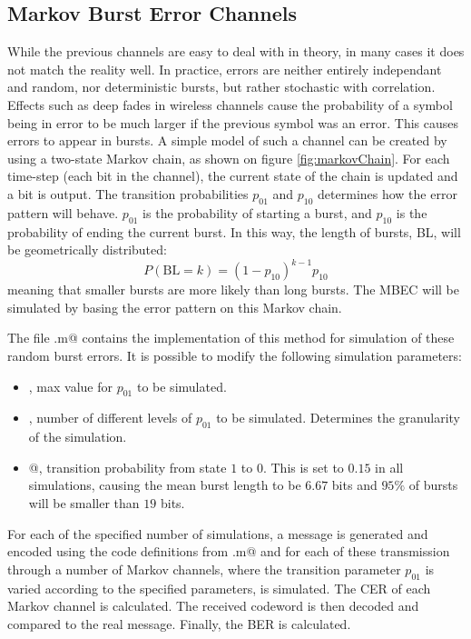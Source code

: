 \subsection{Markov Burst Error Channels}
While the previous channels are easy to deal with in theory, in many cases it does not match the reality well. In practice, errors are neither entirely independant and random, nor deterministic bursts, but rather stochastic with correlation. Effects such as deep fades in wireless channels cause the probability of a symbol being in error to be much larger if the previous symbol was an error. This causes errors to appear in bursts. A simple model of such a channel can be created by using a two-state Markov chain, as shown on figure \ref{fig:markovChain}. For each time-step (each bit in the channel), the current state of the chain is updated and a bit is output. The transition probabilities $p_{01}$ and $p_{10}$ determines how the error pattern will behave. $p_{01}$ is the probability of starting a burst, and $p_{10}$ is the probability of ending the current burst. In this way, the length of bursts, BL, will be geometrically distributed:
\begin{equation}
P(\text{BL} = k) = (1-p_{10})^{k-1}  p_{10}
\end{equation}
meaning that smaller bursts are more likely than long bursts. The MBEC will be simulated by basing the error pattern on this Markov chain.


The file \verb@markovErrors.m@ contains the implementation of this method for simulation of these random burst errors. It is possible to modify the following simulation parameters:
\begin{itemize}\setlength\itemsep{0pt}
\item \verb@burstProbabilityMax@, max value for $p_{01}$ to be simulated.
\item \verb@burstProbabilityLevels@, number of different levels of $p_{01}$ to be simulated. Determines the granularity of the simulation.
\item {}@, transition probability from state $1$ to $0$. This is set to $0.15$ in all simulations, causing the mean burst length to be $6.67$ bits and $95\%$ of bursts will be smaller than $19$ bits.
\end{itemize}
For each of the specified number of simulations, a message is generated and encoded using the code definitions from \verb@trellisGenerator.m@ and for each of these transmission through a number of Markov channels, where the transition parameter $p_{01}$ is varied according to the specified parameters, is simulated. The CER of each Markov channel is calculated. The received codeword is then decoded and compared to the real message. Finally, the BER is calculated.